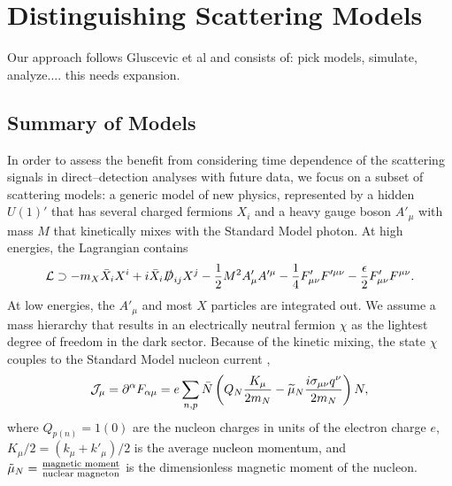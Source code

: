\documentclass[11pt]{article}
\newcommand{\pL}{\left(} \newcommand{\pR}{\right)} \newcommand{\bL}{\left[} \newcommand{\bR}{\right]} \newcommand{\cbL}{\left\{} \newcommand{\cbR}{\right\}} \newcommand{\mL}{\left|} \newcommand{\mR}{\right|} \newcommand{\ER}{E_R}
\newcommand{\beq}{\begin{equation}} \newcommand{\eeq}{\end{equation}}
\newcommand{\vgColor}{magenta}
\newcommand{\vg}[1]{{\color{\vgColor} #1}}
\begin{document}
\section{Distinguishing Scattering Models}\label{sec:procedure}

\vg{Our approach follows Gluscevic et al and consists of: pick models, simulate, analyze.... this needs expansion.}
\subsection{Summary of Models}

In order to assess the benefit from considering time dependence of the scattering signals in direct--detection analyses with future data, we focus on a subset of scattering models: a generic model of new physics, represented by a hidden $U(1)'$ that has several charged fermions $X_i$ and a heavy gauge boson $A'_\mu$ with mass $M$ that kinetically mixes with the Standard Model photon. At high energies, the Lagrangian contains
\beq \label{eq:UV-model}
\cL \supset -  m_X \bar X_i X^i + i \bar X_i \slashed D_{ij} X^j  - \frac12 M^2 A'_\mu A'^\mu  - \frac14 F'_{\mu \nu} F'^{\mu \nu} - \frac\epsilon2 F'_{\mu \nu} F^{\mu \nu}.
\eeq
At low energies, the $A'_\mu$ and most $X$ particles are integrated out. We assume a mass hierarchy that results in an electrically neutral fermion $\chi$ as the lightest degree of freedom in the dark sector. Because of the kinetic mixing, the state $\chi$ couples to the Standard Model nucleon current \cite{Gresham:2014vja},
\beq \label{eq:current}
\cJ_\mu = \partial^\alpha F_{\alpha \mu} = e \sum_{n,p} \bar N \pL Q_N \frac{K_\mu}{2m_N} -\widetilde \mu_N \frac{i \sigma_{\mu \nu}q^\nu}{2m_N} \pR N,
\eeq 
where $Q_{p(n)}=1(0)$ are the nucleon charges in units of the electron charge $e$, $K_\mu/2 = (k_\mu + k'_\mu)/2$ is the average nucleon momentum, and $\tilde{\mu}_N = {\text{magnetic moment} \over \text{nuclear magneton}}$ is the dimensionless magnetic moment of the nucleon.
\end{document}
